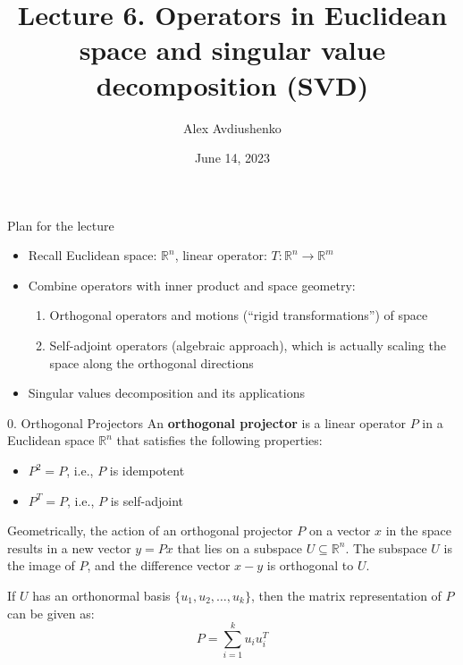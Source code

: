 \documentclass[fullscreen=true, bookmarks=true, hyperref={pdfencoding=unicode}]{beamer}
\title{Lecture 6. Operators in Euclidean space and singular value decomposition (SVD)}
\author{Alex Avdiushenko}
\institute{Neapolis University Paphos}
\date{June 14, 2023}
\begin{document}

\begin{frame}
\transdissolve[duration=0.2]
\titlepage
\end{frame}


\begin{frame}{Plan for the lecture}
  \begin{itemize}
    \item Recall Euclidean space: $\mathbb{R}^n$, 
    linear operator: $T: \mathbb{R}^n \to \mathbb{R}^m$
    \pause\item Combine operators with inner product and space geometry:
    \begin{enumerate}
      \pause\item Orthogonal operators and motions (``rigid transformations'') of space
      \pause\item Self-adjoint operators (algebraic approach), 
      which is actually scaling the space along the orthogonal directions
      \end{enumerate}
    \pause
    \item Singular values decomposition and its applications
  \end{itemize}
\end{frame}


\begin{frame}{0. Orthogonal Projectors}
  An \textbf{orthogonal projector} is a linear operator $P$ in a Euclidean space 
  $\mathbb{R}^n$ that satisfies the following properties:
  \begin{itemize}
    \pause\item $P^2 = P$, i.e., $P$ is idempotent
    \pause\item $P^T = P$, i.e., $P$ is self-adjoint
  \end{itemize}

  \pause
  Geometrically, the action of an orthogonal projector $P$ 
  on a vector $x$ in the space results in a new vector 
  $y = Px$ that lies on a subspace $U \subseteq \mathbb{R}^n$. 
  The subspace $U$ is the image of $P$, and the difference vector 
  $x - y$ is orthogonal to $U$. 

  If $U$ has an orthonormal basis $\{u_1, u_2, \dots, u_k\}$, 
  then the matrix representation of $P$ can be given as:
  $$P = \sum_{i=1}^{k} u_i u_i^T$$
\end{frame}
\end{document}
